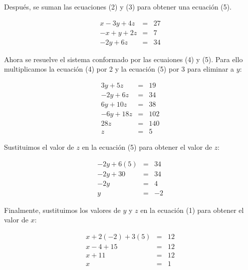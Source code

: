 \documentclass[12pt,addpoints]{repaso}
\begin{document}
\begin{questions}
{\begin{solutionbox}{18cm}
            Después, se suman las ecuaciones (2) y (3) para obtener una ecuación (5).

            \begin{eqnarray}
                x - 3y +4z  & = & 27 \nonumber\\
                -x +  y +2z & = & 7 \nonumber\\ \hline
                -2y + 6z & = & 34 
            \end{eqnarray}

            Ahora se resuelve el sistema conformado por las ecuaiones (4) y (5). Para ello multiplicamos la ecuación (4) por 2 y la ecuación (5) por 3 para eliminar a $y$:

            \begin{eqnarray}
                3y + 5z & = & 19 \nonumber\\
                -2y + 6z & = & 34 \nonumber \\ \hline
               6y + 10z & = & 38 \nonumber\\
                -6y + 18z & = & 102 \nonumber \\ \hline
                28z & = & 140 \nonumber\\
                z & = & 5 \nonumber
            \end{eqnarray}
            
            Sustituimos el valor de $z$ en la ecuación (5) para obtener el valor de $z$:

            \begin{eqnarray}
                -2y + 6(5) & = & 34 \nonumber\\
                -2y + 30 & = & 34 \nonumber\\
                -2y & = & 4 \nonumber\\
                y & = & -2 \nonumber
            \end{eqnarray}

            Finalmente, sustituimos los valores de $y$ y $z$ en la ecuación (1) para obtener el valor de $x$:

            \begin{eqnarray}
                x + 2(-2) + 3(5) & = & 12 \nonumber\\
                x - 4 + 15 & = & 12 \nonumber\\
                x + 11 & = & 12 \nonumber\\
                x & = & 1 \nonumber
            \end{eqnarray}
        \end{solutionbox}
    }


\end{questions}
\end{document}
